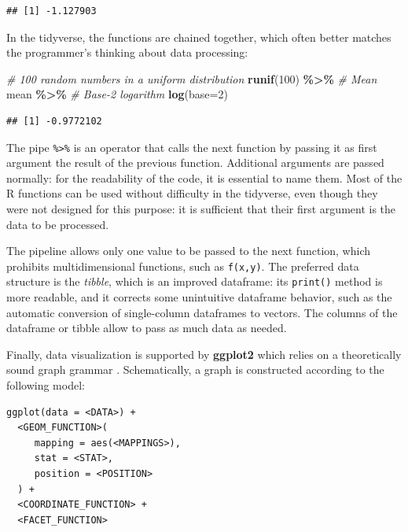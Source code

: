 \documentclass[
  12pt,
  american,
  a4paper,
  extrafontsizes,onecolumn,openright
  ]{memoir}
\newenvironment{Shaded}{\begin{snugshade}}{\end{snugshade}}
\newcommand{\AttributeTok}[1]{\textcolor[rgb]{0.13,0.29,0.53}{#1}}
\newcommand{\CommentTok}[1]{\textcolor[rgb]{0.56,0.35,0.01}{\textit{#1}}}
\newcommand{\DecValTok}[1]{\textcolor[rgb]{0.00,0.00,0.81}{#1}}
\newcommand{\FunctionTok}[1]{\textcolor[rgb]{0.13,0.29,0.53}{\textbf{#1}}}
\newcommand{\NormalTok}[1]{#1}
\newcommand{\SpecialCharTok}[1]{\textcolor[rgb]{0.81,0.36,0.00}{\textbf{#1}}}
\begin{document}
\begin{verbatim}
## [1] -1.127903
\end{verbatim}

\normalsize

In the tidyverse, the functions are chained together, which often better matches the programmer's thinking about data processing:

\scriptsize

\begin{Shaded}
\begin{Highlighting}[]
\CommentTok{\# 100 random numbers in a uniform distribution}
\FunctionTok{runif}\NormalTok{(}\DecValTok{100}\NormalTok{) }\SpecialCharTok{\%\textgreater{}\%} 
  \CommentTok{\# Mean}
\NormalTok{  mean }\SpecialCharTok{\%\textgreater{}\%} 
  \CommentTok{\# Base{-}2 logarithm}
  \FunctionTok{log}\NormalTok{(}\AttributeTok{base=}\DecValTok{2}\NormalTok{)}
\end{Highlighting}
\end{Shaded}

\begin{verbatim}
## [1] -0.9772102
\end{verbatim}

\normalsize

The pipe \texttt{\%\textgreater{}\%} is an operator that calls the next function by passing it as first argument the result of the previous function.
Additional arguments are passed normally: for the readability of the code, it is essential to name them.
Most of the R functions can be used without difficulty in the tidyverse, even though they were not designed for this purpose: it is sufficient that their first argument is the data to be processed.

The pipeline allows only one value to be passed to the next function, which prohibits multidimensional functions, such as \texttt{f(x,y)}.
The preferred data structure is the \emph{tibble}, which is an improved dataframe: its \texttt{print()} method is more readable, and it corrects some unintuitive dataframe behavior, such as the automatic conversion of single-column dataframes to vectors.
The columns of the dataframe or tibble allow to pass as much data as needed.

Finally, data visualization is supported by \textbf{ggplot2} which relies on a theoretically sound graph grammar \autocite{Wickham2010}.
Schematically, a graph is constructed according to the following model:

\begin{verbatim}
ggplot(data = <DATA>) + 
  <GEOM_FUNCTION>(
     mapping = aes(<MAPPINGS>),
     stat = <STAT>, 
     position = <POSITION>
  ) +
  <COORDINATE_FUNCTION> +
  <FACET_FUNCTION>
\end{verbatim}
\end{document}
